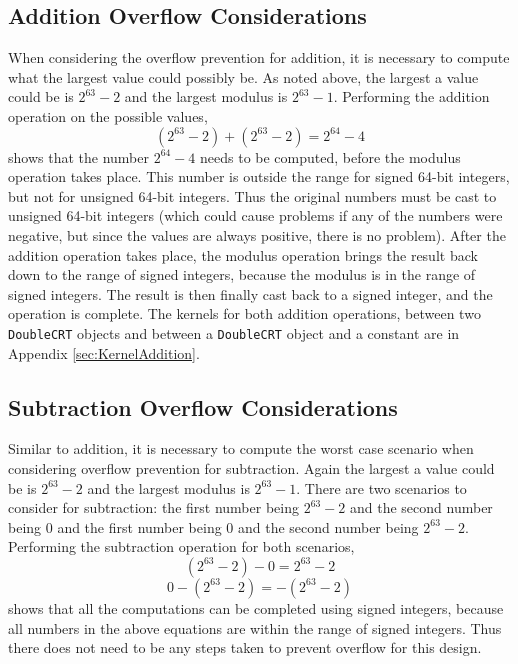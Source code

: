 \subsection{Addition Overflow Considerations}
When considering the overflow prevention for addition, it is necessary to compute what the largest value could possibly be. As noted above, the largest a value could be is $2^{63} - 2$ and the largest modulus is $2^{63} - 1$. Performing the addition operation on the possible values, 
\begin{equation} \label{eq:add}
(2^{63} - 2) + (2^{63} - 2) = 2^{64} - 4
\end{equation}
shows that the number $2^{64} - 4$ needs to be computed, before the modulus operation takes place. This number is outside the range for signed 64-bit integers, but not for unsigned 64-bit integers. Thus the original numbers must be cast to unsigned 64-bit integers (which could cause problems if any of the numbers were negative, but since the values are always positive, there is no problem). After the addition operation takes place, the modulus operation brings the result back down to the range of signed integers, because the modulus is in the range of signed integers. The result is then finally cast back to a signed integer, and the operation is complete. The kernels for both addition operations, between two \verb|DoubleCRT| objects and between a \verb|DoubleCRT| object and a constant are in Appendix 
\ref{sec:KernelAddition}.

\subsection{Subtraction Overflow Considerations}
Similar to addition, it is necessary to compute the worst case scenario when considering overflow prevention for subtraction. Again the largest a value could be is $2^{63} - 2$ and the largest modulus is $2^{63} - 1$. There are two scenarios to consider for subtraction: the first number being $2^{63} - 2$ and the second number being 0 and the first number being 0 and the second number being $2^{63} - 2$. Performing the subtraction operation for both scenarios,
\begin{equation} \label{eq:sub1}
(2^{63} - 2) - 0 = 2^{63} - 2
\end{equation}
\begin{equation} \label{eq:sub2}
0 - (2^{63} - 2) = -(2^{63} - 2)
\end{equation}
shows that all the computations can be completed using signed integers, because all numbers in the above equations are within the range of signed integers. Thus there does not need to be any steps taken to prevent overflow for this design. 

